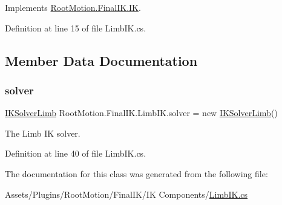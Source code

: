 Implements \mbox{\hyperlink{class_root_motion_1_1_final_i_k_1_1_i_k_a1922e31d550e27dcc60eca0d62c699c5}{Root\+Motion.\+Final\+I\+K.\+IK}}.



Definition at line 15 of file Limb\+I\+K.\+cs.



\subsection{Member Data Documentation}
\mbox{\label{class_root_motion_1_1_final_i_k_1_1_limb_i_k_a6ec986247a8754477daedd78c7b8b70a}} 
\subsubsection{\texorpdfstring{solver}{solver}}
{\footnotesize\ttfamily \mbox{\hyperlink{class_root_motion_1_1_final_i_k_1_1_i_k_solver_limb}{I\+K\+Solver\+Limb}} Root\+Motion.\+Final\+I\+K.\+Limb\+I\+K.\+solver = new \mbox{\hyperlink{class_root_motion_1_1_final_i_k_1_1_i_k_solver_limb}{I\+K\+Solver\+Limb}}()}



The Limb IK solver. 



Definition at line 40 of file Limb\+I\+K.\+cs.



The documentation for this class was generated from the following file\+:\begin{DoxyCompactItemize}
\item 
Assets/\+Plugins/\+Root\+Motion/\+Final\+I\+K/\+I\+K Components/\mbox{\hyperlink{_limb_i_k_8cs}{Limb\+I\+K.\+cs}}\end{DoxyCompactItemize}
